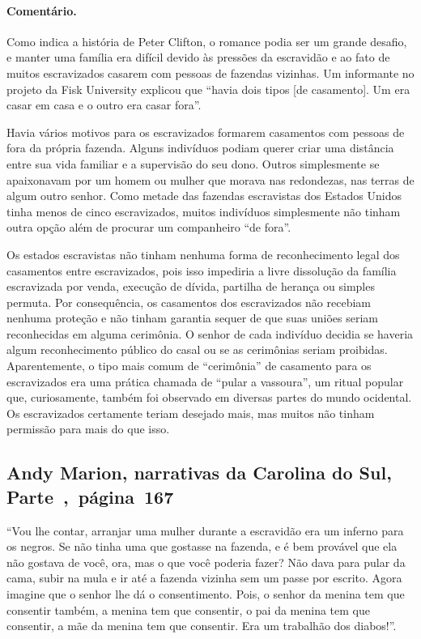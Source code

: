 \paragraph{Comentário.}\quad
{\small
Como indica a história de Peter Clifton, o romance podia ser um
grande desafio, e manter uma família era difícil devido às pressões da
escravidão e ao fato de muitos escravizados casarem com pessoas de fazendas
vizinhas. Um informante no projeto da Fisk University explicou que
``havia dois tipos {[}de casamento{]}. Um era casar em casa e o outro
era casar fora''. 

Havia vários motivos para os escravizados formarem casamentos com
pessoas de fora da própria fazenda. Alguns indivíduos podiam querer
criar uma distância entre sua vida familiar e a supervisão do seu dono.
Outros simplesmente se apaixonavam por um homem ou mulher que morava nas
redondezas, nas terras de algum outro senhor. Como metade das fazendas
escravistas dos Estados Unidos tinha menos de cinco escravizados, muitos
indivíduos simplesmente não tinham outra opção além de procurar um
companheiro ``de fora''.

Os estados escravistas não tinham nenhuma forma de reconhecimento
legal dos casamentos entre escravizados, pois isso impediria a livre
dissolução da família escravizada por venda, execução de dívida, partilha de
herança ou simples permuta. Por consequência, os casamentos dos escravizados
não recebiam nenhuma proteção e não tinham garantia sequer de que suas
uniões seriam reconhecidas em alguma cerimônia. O senhor de cada
indivíduo decidia se haveria algum reconhecimento público do casal ou se
as cerimônias seriam proibidas. Aparentemente, o tipo mais comum de
``cerimônia'' de casamento para os escravizados era uma prática chamada de
``pular a vassoura'', um ritual popular que, curiosamente, também foi
observado em diversas partes do mundo ocidental. Os escravizados certamente
teriam desejado mais, mas muitos não tinham permissão para mais do que
isso.
}

\subsection{Andy Marion, narrativas da Carolina do Sul, Parte~,~página~167}
\label{ref182}

``Vou lhe contar, arranjar uma mulher durante a escravidão era um
inferno para os negros. Se não tinha uma que gostasse na fazenda, e é
bem provável que ela não gostava de você, ora, mas o que você poderia
fazer? Não dava para pular da cama, subir na mula e ir até a fazenda
vizinha sem um passe por escrito. Agora imagine que o senhor lhe dá o
consentimento. Pois, o senhor da menina tem que consentir também, a
menina tem que consentir, o pai da menina tem que consentir, a mãe da
menina tem que consentir. Era um trabalhão dos diabos!''.

